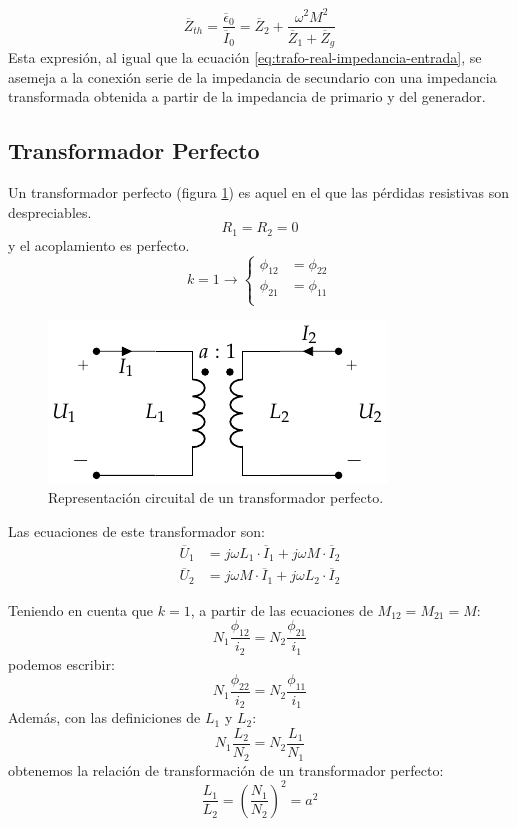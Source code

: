 \begin{equation}
  \label{eq:trafo-real-impedancia-thevenin}
  \boxed{\overline{Z}_{th} = \frac{\overline{\epsilon}_0}{\overline{I}_0} = \overline{Z}_2 + \frac{\omega^2 M^2}{\overline{Z}_1 + \overline{Z}_g}}
\end{equation}
Esta expresión, al igual que la ecuación \ref{eq:trafo-real-impedancia-entrada}, se asemeja a la conexión serie de la impedancia de secundario con una impedancia transformada obtenida a partir de la impedancia de primario y del generador.

\subsection{Transformador Perfecto}
\label{sec:trafo-perfecto}

Un transformador perfecto (figura \ref{fig:trafo-perfecto}) es aquel en el que las pérdidas resistivas son despreciables.
\[
  R_1 = R_2 = 0
\]
y el acoplamiento es perfecto.
\[
  k = 1
\rightarrow 
\left\{
\begin{array}{cc}
  \phi_{12} &= \phi_{22}\\
  \phi_{21} &= \phi_{11}\\
\end{array} \right.
\]

\begin{figure}
  \centering
  \includegraphics[height=0.2\textheight]{../figs/Trafo_Perfecto.pdf}
  \caption{Representación circuital de un transformador perfecto.}
  \label{fig:trafo-perfecto}
\end{figure}

Las ecuaciones de este transformador son:
\begin{align*}
  \overline{U}_1 &= j \omega L_1 \cdot \overline{I}_1 + j \omega M \cdot \overline{I}_2\\
  \overline{U}_2 &= j \omega M \cdot \overline{I}_1 + j \omega L_2 \cdot \overline{I}_2
\end{align*}

Teniendo en cuenta que $k = 1$, a partir de las ecuaciones de $M_{12} = M_{21} = M$:
\[
  N_1 \frac{\phi_{12}}{i_2} = N_2 \frac{\phi_{21}}{i_1}
\]
podemos escribir:
\[  
  N_1 \frac{\phi_{22}}{i_2} = N_2 \frac{\phi_{11}}{i_1}
\]
Además, con las definiciones de $L_1$ y $L_2$:
\[
  N_1 \frac{L_2}{N_2} = N_2 \frac{L_1}{N_1}
\]
obtenemos la relación de transformación de un transformador perfecto:
\begin{equation}
  \label{eq:trafo-perfecto-a}
  \boxed{\frac{L_1}{L_2} = \left(\frac{N_1}{N_2}\right)^2 = a^2}
\end{equation}


